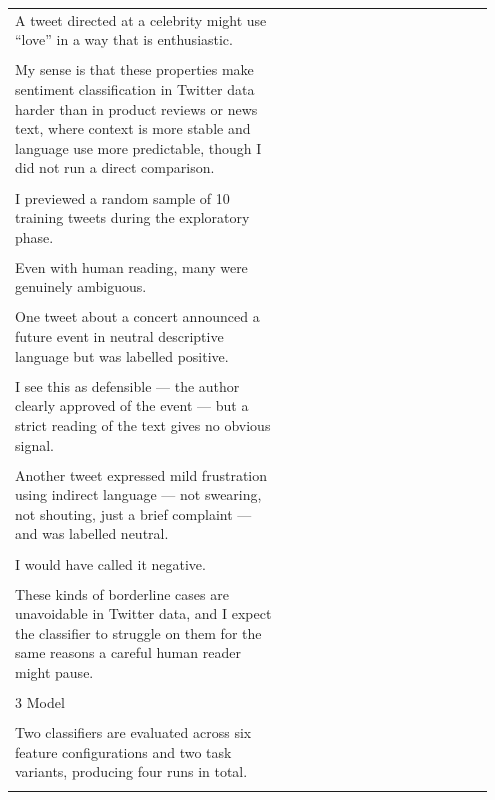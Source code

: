 \documentclass[11pt]{article}
\begin{document}
\begin{longtable}{|p{0.55\linewidth}|p{0.40\linewidth}|}
\hline
\rule{0pt}{3.5cm} & \\
\hline
A tweet directed at a celebrity might use ``love'' in a way that is enthusiastic. & \\[2pt]
\hline
\rule{0pt}{3.5cm} & \\
\hline
My sense is that these properties make sentiment classification in Twitter data harder than in product reviews or news text, where context is more stable and language use more predictable, though I did not run a direct comparison. & \\[2pt]
\hline
\rule{0pt}{3.5cm} & \\
\hline
I previewed a random sample of 10 training tweets during the exploratory phase. & \\[2pt]
\hline
\rule{0pt}{3.5cm} & \\
\hline
Even with human reading, many were genuinely ambiguous. & \\[2pt]
\hline
\rule{0pt}{3.5cm} & \\
\hline
One tweet about a concert announced a future event in neutral descriptive language but was labelled positive. & \\[2pt]
\hline
\rule{0pt}{3.5cm} & \\
\hline
I see this as defensible --- the author clearly approved of the event --- but a strict reading of the text gives no obvious signal. & \\[2pt]
\hline
\rule{0pt}{3.5cm} & \\
\hline
Another tweet expressed mild frustration using indirect language --- not swearing, not shouting, just a brief complaint --- and was labelled neutral. & \\[2pt]
\hline
\rule{0pt}{3.5cm} & \\
\hline
I would have called it negative. & \\[2pt]
\hline
\rule{0pt}{3.5cm} & \\
\hline
These kinds of borderline cases are unavoidable in Twitter data, and I expect the classifier to struggle on them for the same reasons a careful human reader might pause. & \\[2pt]
\hline
\rule{0pt}{3.5cm} & \\
\hline
3 Model & \\[2pt]
\hline
\rule{0pt}{3.5cm} & \\
\hline
Two classifiers are evaluated across six feature configurations and two task variants, producing four runs in total. & \\[2pt]
\hline
\rule{0pt}{3.5cm} & \\

\end{longtable}
\end{document}
